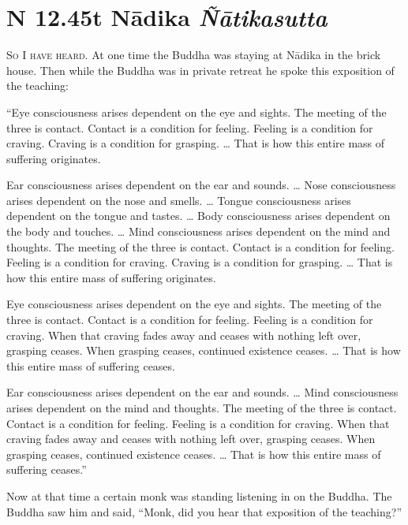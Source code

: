 \documentclass[12pt,openany]{book}%
\newcommand*{\suttatitleacronym}[1]{\smaller[2]{#1}\vspace*{.3em}}
\newcommand*{\suttatitletranslation}[1]{\linebreak{#1}}
\newcommand*{\suttatitleroot}[1]{\linebreak\smaller[2]\itshape{#1}}
\newcommand*{\tocacronym}[1]{\hspace*{-3.3em}{#1}\quad}
\newcommand*{\toctranslation}[1]{#1}
\newcommand*{\tocroot}[1]{(\textit{#1})}
\newcommand*{\scevam}[1]{\textsc{#1}}
\begin{document}
%
\section*{{\suttatitleacronym SN 12.45}{\suttatitletranslation At Nādika }{\suttatitleroot Ñātikasutta}}
\addcontentsline{toc}{section}{\tocacronym{SN 12.45} \toctranslation{At Nādika } \tocroot{Ñātikasutta}}

\scevam{So I have heard. }At one time the Buddha was staying at \textsanskrit{Nādika} in the brick house. Then while the Buddha was in private retreat he spoke this exposition of the teaching: 

“Eye consciousness arises dependent on the eye and sights. The meeting of the three is contact. Contact is a condition for feeling. Feeling is a condition for craving. Craving is a condition for grasping. … That is how this entire mass of suffering originates. 

Ear consciousness arises dependent on the ear and sounds. … Nose consciousness arises dependent on the nose and smells. … Tongue consciousness arises dependent on the tongue and tastes. … Body consciousness arises dependent on the body and touches. … Mind consciousness arises dependent on the mind and thoughts. The meeting of the three is contact. Contact is a condition for feeling. Feeling is a condition for craving. Craving is a condition for grasping. … That is how this entire mass of suffering originates. 

Eye consciousness arises dependent on the eye and sights. The meeting of the three is contact. Contact is a condition for feeling. Feeling is a condition for craving. When that craving fades away and ceases with nothing left over, grasping ceases. When grasping ceases, continued existence ceases. … That is how this entire mass of suffering ceases. 

Ear consciousness arises dependent on the ear and sounds. … Mind consciousness arises dependent on the mind and thoughts. The meeting of the three is contact. Contact is a condition for feeling. Feeling is a condition for craving. When that craving fades away and ceases with nothing left over, grasping ceases. When grasping ceases, continued existence ceases. … That is how this entire mass of suffering ceases.” 

Now at that time a certain monk was standing listening in on the Buddha. The Buddha saw him and said, “Monk, did you hear that exposition of the teaching?” 
\end{document}
